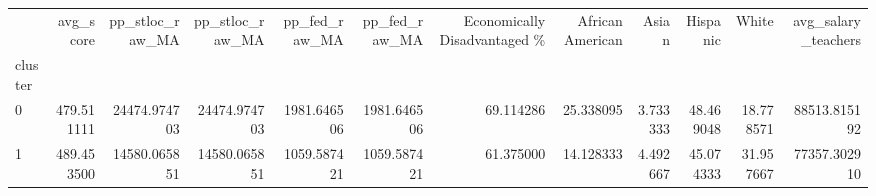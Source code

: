 \begin{tabular}{lrrrrrrrrrrr}
\toprule
{} &   avg\_score &  pp\_stloc\_raw\_MA &  pp\_stloc\_raw\_MA &  pp\_fed\_raw\_MA &  pp\_fed\_raw\_MA &  Economically Disadvantaged \% &  African American &     Asian &   Hispanic &      White &  avg\_salary\_teachers \\
cluster &             &                  &                  &                &                &                               &                   &           &            &            &                      \\
\midrule
0       &  479.511111 &     24474.974703 &     24474.974703 &    1981.646506 &    1981.646506 &                     69.114286 &         25.338095 &  3.733333 &  48.469048 &  18.778571 &         88513.815192 \\
1       &  489.453500 &     14580.065851 &     14580.065851 &    1059.587421 &    1059.587421 &                     61.375000 &         14.128333 &  4.492667 &  45.074333 &  31.957667 &         77357.302910 \\
\bottomrule
\end{tabular}
